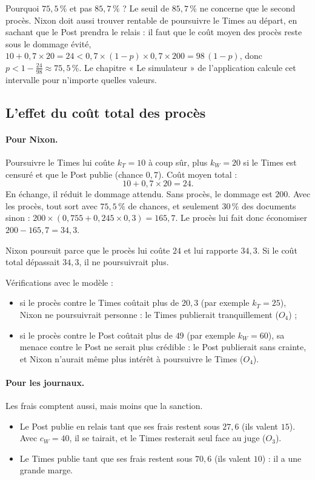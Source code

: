 \documentclass[11pt,a4paper]{article}
\theoremstyle{definition}
\begin{document}
Pourquoi $75,5\,\%$ et pas $85,7\,\%$ ? Le seuil de $85,7\,\%$ ne concerne que le second procès. Nixon doit aussi trouver rentable de poursuivre le Times au départ, en sachant que le Post prendra le relais : il faut que le coût moyen des procès reste sous le dommage évité, $10+0,7\times20=24<0,7\times(1-p)\times0,7\times200=98\,(1-p)$, donc $p<1-\frac{24}{98}\approx75,5\,\%$. Le chapitre « Le simulateur » de l'application calcule cet intervalle pour n'importe quelles valeurs.

\subsection{L'effet du coût total des procès}
\paragraph{Pour Nixon.} Poursuivre le Times lui coûte $k_T=10$ à coup sûr, plus $k_W=20$ si le Times est censuré et que le Post publie (chance $0,7$). Coût moyen total :
\[
10+0,7\times20=24 .
\]
En échange, il réduit le dommage attendu. Sans procès, le dommage est $200$. Avec les procès, tout sort avec $75,5\,\%$ de chances, et seulement $30\,\%$ des documents sinon : $200\times(0,755+0,245\times0,3)=165,7$. Le procès lui fait donc économiser $200-165,7=34,3$.
\begin{simple}
Nixon poursuit parce que le procès lui coûte $24$ et lui rapporte $34,3$. Si le coût total dépassait $34,3$, il ne poursuivrait plus.
\end{simple}
Vérifications avec le modèle :
\begin{itemize}[leftmargin=*,itemsep=1pt]
\item si le procès contre le Times coûtait plus de $20,3$ (par exemple $k_T=25$), Nixon ne poursuivrait personne : le Times publierait tranquillement ($O_4$) ;
\item si le procès contre le Post coûtait plus de $49$ (par exemple $k_W=60$), sa menace contre le Post ne serait plus crédible : le Post publierait sans crainte, et Nixon n'aurait même plus intérêt à poursuivre le Times ($O_4$).
\end{itemize}

\paragraph{Pour les journaux.} Les frais comptent aussi, mais moins que la sanction.
\begin{itemize}[leftmargin=*,itemsep=1pt]
\item Le Post publie en relais tant que ses frais restent sous $27,6$ (ils valent $15$). Avec $c_W=40$, il se tairait, et le Times resterait seul face au juge ($O_3$).
\item Le Times publie tant que ses frais restent sous $70,6$ (ils valent $10$) : il a une grande marge.
\end{itemize}
\end{document}
